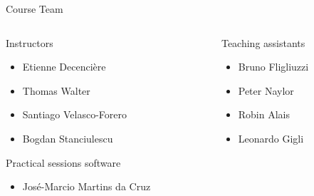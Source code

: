 \documentclass[xcolor=pdftex,dvipsnames,table,mathserif]{beamer}
\begin{document}
\begin{frame}{Course Team}

  {\scriptsize

\begin{columns}
  \begin{column}{.5\textwidth}

    \begin{block}{Instructors}
      \begin{itemize}
      \item Etienne Decencière
      \item Thomas Walter
      \item Santiago Velasco-Forero
      \item Bogdan Stanciulescu
      \end{itemize}
    \end{block}

    \begin{block}{Practical sessions software}
      \begin{itemize}
      \item José-Marcio Martins da Cruz
      \end{itemize}
    \end{block}

  \end{column}

  \begin{column}{.5\textwidth}
    \begin{block}{Teaching assistants}
      \begin{itemize}
      \item Bruno Fligliuzzi
      \item Peter Naylor
      \item Robin Alais
      \item Leonardo Gigli
      \end{itemize}
    \end{block}

  \end{column}
\end{columns}


    }

\end{frame}
\end{document}
